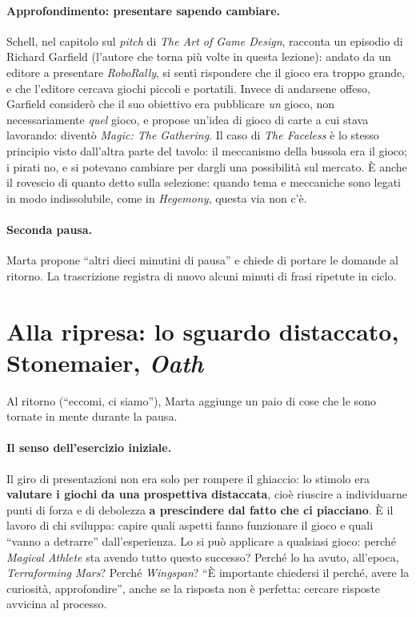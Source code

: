 \paragraph{Approfondimento: presentare sapendo cambiare.} Schell, nel capitolo sul
\emph{pitch} di \emph{The Art of Game Design}, racconta un episodio di Richard Garfield
(l'autore che torna più volte in questa lezione): andato da un editore a presentare
\emph{RoboRally}, si sentì rispondere che il gioco era troppo grande, e che l'editore
cercava giochi piccoli e portatili. Invece di andarsene offeso, Garfield considerò che il
suo obiettivo era pubblicare \emph{un} gioco, non necessariamente \emph{quel} gioco, e
propose un'idea di gioco di carte a cui stava lavorando: diventò \emph{Magic: The
Gathering}. Il caso di \emph{The Faceless} è lo stesso principio visto dall'altra parte del
tavolo: il meccanismo della bussola era il gioco; i pirati no, e si potevano cambiare per
dargli una possibilità sul mercato. È anche il rovescio di quanto detto sulla selezione:
quando tema e meccaniche sono legati in modo indissolubile, come in \emph{Hegemony}, questa
via non c'è.

\paragraph{Seconda pausa.} Marta propone ``altri dieci minutini di pausa'' e chiede di
portare le domande al ritorno. La trascrizione registra di nuovo alcuni minuti di frasi
ripetute in ciclo.

\section{Alla ripresa: lo sguardo distaccato, Stonemaier, \emph{Oath}}
\label{a13:sec:ripresa}

Al ritorno (``eccomi, ci siamo''), Marta aggiunge un paio di cose che le sono tornate in
mente durante la pausa.

\paragraph{Il senso dell'esercizio iniziale.} Il giro di presentazioni non era solo per
rompere il ghiaccio: lo stimolo era \textbf{valutare i giochi da una prospettiva
distaccata}, cioè riuscire a individuarne punti di forza e di debolezza \textbf{a
prescindere dal fatto che ci piacciano}. È il lavoro di chi sviluppa: capire quali aspetti
fanno funzionare il gioco e quali ``vanno a detrarre'' dall'esperienza. Lo si può
applicare a qualsiasi gioco: perché \emph{Magical Athlete} sta avendo tutto questo
successo? Perché lo ha avuto, all'epoca, \emph{Terraforming Mars}? Perché \emph{Wingspan}?
``È importante chiedersi il perché, avere la curiosità, approfondire'', anche se la
risposta non è perfetta: cercare risposte avvicina al processo.

